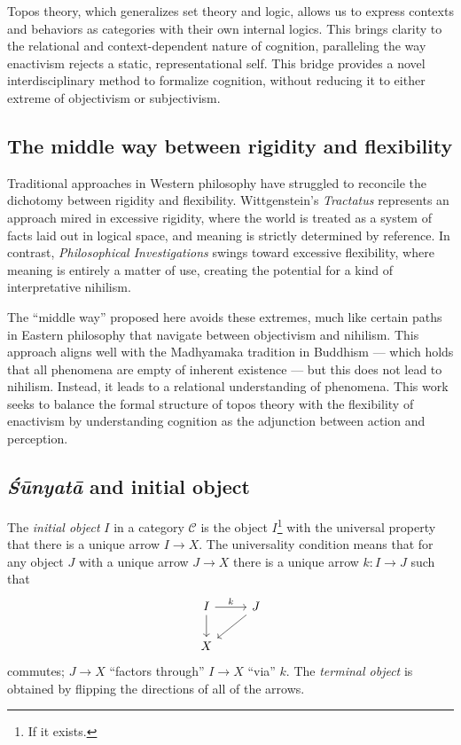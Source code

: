\documentclass{article}
\begin{document}
Topos theory, which generalizes set theory and logic, allows us to express contexts and behaviors as categories with their own internal logics. This brings clarity to the relational and context-dependent nature of cognition, paralleling the way enactivism rejects a static, representational self. This bridge provides a novel interdisciplinary method to formalize cognition, without reducing it to either extreme of objectivism or subjectivism.


\subsection{The middle way between rigidity and flexibility}
Traditional approaches in Western philosophy have struggled to reconcile the dichotomy between rigidity and flexibility. Wittgenstein's \emph{Tractatus} represents an approach mired in excessive rigidity, where the world is treated as a system of facts laid out in logical space, and meaning is strictly determined by reference. In contrast, \emph{Philosophical Investigations} swings toward excessive flexibility, where meaning is entirely a matter of use, creating the potential for a kind of interpretative nihilism.

The ``middle way'' proposed here avoids these extremes, much like certain paths in Eastern philosophy that navigate between objectivism and nihilism. This approach aligns well with the Madhyamaka tradition in Buddhism --- which holds that all phenomena are empty of inherent existence --- but this does not lead to nihilism. Instead, it leads to a relational understanding of phenomena. This work seeks to balance the formal structure of topos theory with the flexibility of enactivism by understanding cognition as the adjunction between action and perception.

\subsection{\emph{Śūnyatā} and initial object}
The \emph{initial object} $I$ in a category $\mathcal{C}$ is the object $I$\footnote{If it exists.} with the universal property that there is a unique arrow $I \to X$. The universality condition means that for any object $J$ with a unique arrow $J \to X$ there is a unique arrow $k \colon I \to J$ such that
\[
    \begin{tikzcd}
        I \arrow[r, "k"] \arrow[d] & J \arrow[ld] \\
        X
    \end{tikzcd}
\]
commutes; $J \to X$ ``factors through'' $I \to X$ ``via'' $k$. The \emph{terminal object} is obtained by flipping the directions of all of the arrows.
\end{document}
